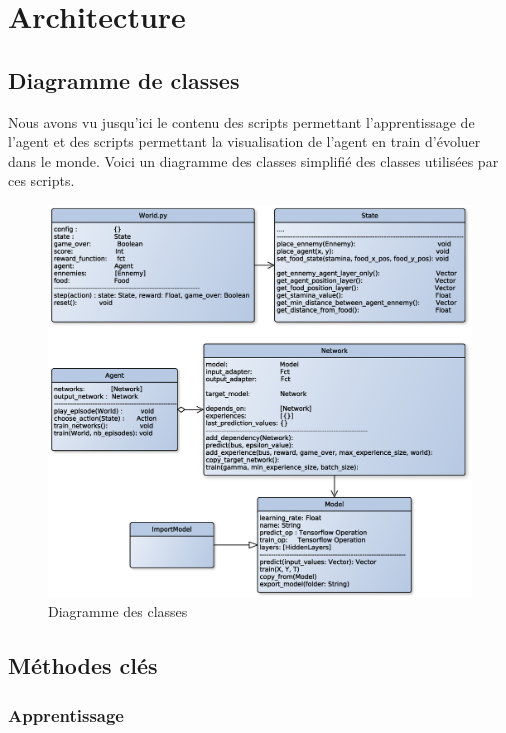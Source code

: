 \documentclass[11pt,a4paper]{report}
\begin{document}
  \section{Architecture}
  
  \subsection{Diagramme de classes}
  
  \par Nous avons vu jusqu'ici le contenu des scripts permettant l'apprentissage de l'agent et des scripts permettant la visualisation de l'agent en train d'évoluer dans le monde. Voici un diagramme des classes simplifié des classes utilisées par ces scripts. 
  
  \begin{figure}[!h]
  \center
  \includegraphics[scale=0.6]{ressources/class_diagram.eps}
  \caption{Diagramme des classes}
  \end{figure} 
  
  \newpage
  \subsection{Méthodes clés}
  
  \subsubsection{Apprentissage}
  
\end{document}

